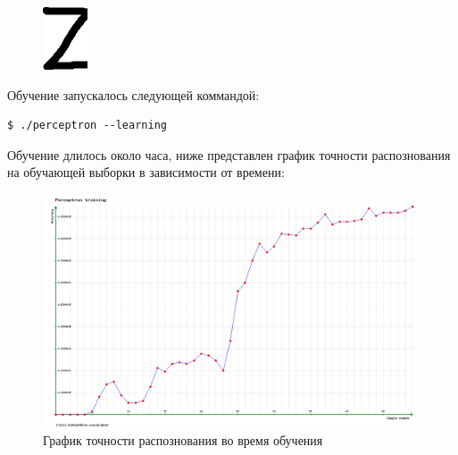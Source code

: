 \documentclass[russian,utf8,emptystyle]{eskdtext}
\begin{document}
\begin{figure}[!htb]
\includegraphics[width=\linewidth]{../data/learn/z/001}
\endminipage\hfill
\end{figure}

Обучение запускалось следующей коммандой:
\begin{verbatim}
$ ./perceptron --learning
\end{verbatim}

Обучение длилось около часа, ниже представлен график точности распознования на обучающей выборки в зависимости от времени:
\begin{figure}[h!]
\includegraphics[width=1\textwidth]{perceptron_training}
\caption{График точности распознования во время обучения}
\end{figure}
\end{document}
